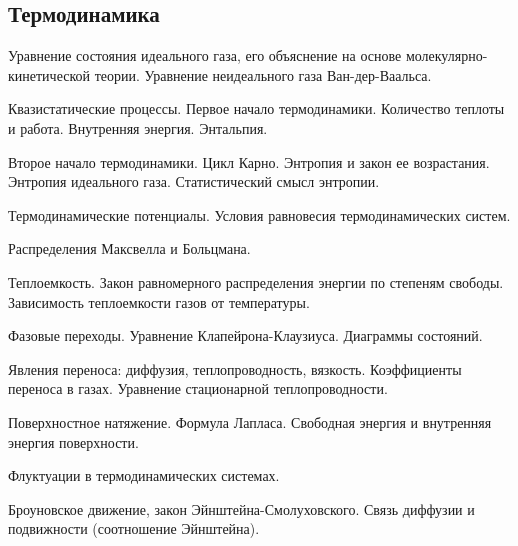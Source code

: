 \subsection*{Термодинамика}
\begin{enumerate*}
\setcounter{enumi}{9}
\item Уравнение состояния идеального газа, его объяснение на основе молекулярно-кинетической теории. Уравнение неидеального газа Ван-дер-Ваальса.
\item Квазистатические процессы. Первое начало термодинамики. Количество теплоты и работа. Внутренняя энергия. Энтальпия.
\item Второе начало термодинамики. Цикл Карно. Энтропия и закон ее возрастания. Энтропия идеального газа. Статистический смысл энтропии.
\item Термодинамические потенциалы. Условия равновесия термодинамических систем.
\item Распределения Максвелла и Больцмана.
\item Теплоемкость. Закон равномерного распределения энергии по степеням свободы. Зависимость теплоемкости газов от температуры.
\item Фазовые переходы. Уравнение Клапейрона-Клаузиуса. Диаграммы состояний.
\item Явления переноса: диффузия, теплопроводность, вязкость. Коэффициенты переноса в газах. Уравнение стационарной теплопроводности.
\item Поверхностное натяжение. Формула Лапласа. Свободная энергия и внутренняя энергия поверхности.
\item Флуктуации в термодинамических системах.
\item Броуновское движение, закон Эйнштейна-Смолуховского. Связь диффузии и подвижности (соотношение Эйнштейна).
\end{enumerate*}


